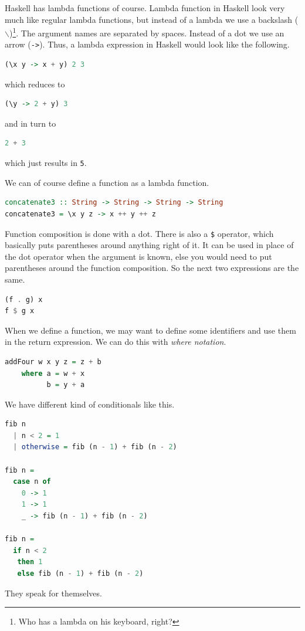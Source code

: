 \documentclass[11pt]{article}
\begin{document}
Haskell has lambda functions of course. Lambda function in Haskell look very
much like regular lambda functions, but instead of a lambda we use a backslash
(\texttt{$\backslash$})\footnote{Who has a lambda on his keyboard, right?}. The
argument names are separated by spaces. Instead of a dot we use an arrow
(\texttt{->}).  Thus, a lambda expression in Haskell would look like the
following.
\begin{lstlisting}[language=Haskell]
(\x y -> x + y) 2 3
\end{lstlisting}
which reduces to
\begin{lstlisting}[language=Haskell]
(\y -> 2 + y) 3
\end{lstlisting}
and in turn to
\begin{lstlisting}[language=Haskell]
2 + 3
\end{lstlisting}
which just results in \texttt{5}.

We can of course define a function as a lambda function.
\begin{lstlisting}[language=Haskell]
concatenate3 :: String -> String -> String -> String
concatenate3 = \x y z -> x ++ y ++ z
\end{lstlisting}

Function composition is done with a dot. There is also a \texttt{\$} operator,
which basically puts parentheses around anything right of it. It can be used in
place of the dot operator when the argument is known, else you would need to
put parentheses around the function composition. So the next two expressions
are the same.
\begin{lstlisting}[language=Haskell]
(f . g) x
f $ g x
\end{lstlisting}

When we define a function, we may want to define some identifiers and use them
in the return expression. We can do this with \emph{where notation}.
\begin{lstlisting}[language=Haskell]
addFour w x y z = z + b
    where a = w + x
          b = y + a
\end{lstlisting}

We have different kind of conditionals like this.
\begin{lstlisting}[language=Haskell]
fib n
  | n < 2 = 1
  | otherwise = fib (n - 1) + fib (n - 2)

fib n = 
  case n of
    0 -> 1
    1 -> 1
    _ -> fib (n - 1) + fib (n - 2)

fib n =
  if n < 2
   then 1
   else fib (n - 1) + fib (n - 2)
\end{lstlisting}
They speak for themselves.
\end{document}
